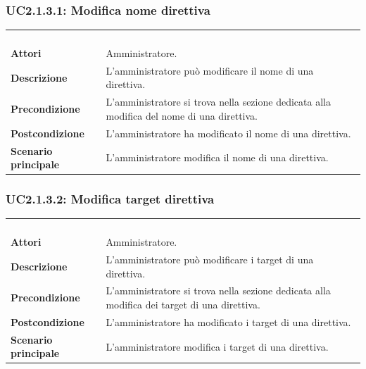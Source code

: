\newpage
\subsubsection{UC2.1.3.1: Modifica nome direttiva}
\label{UC2.1.3.1}
\begin{longtable}{l|p{10cm}}
\rowcolor[gray]{0.8} \multicolumn{2}{c}{} \\
\rowcolor[gray]{0.8} \multicolumn{2}{c}{\textbf{UC2.1.3.1 - Modifica nome direttiva}} \\
\rowcolor[gray]{0.8} \multicolumn{2}{c}{} \\
\hline
&\\
\textbf{Attori} & Amministratore.\\[7pt]
\textbf{Descrizione} & L'amministratore può modificare il nome di una direttiva.\\[7pt]
\textbf{Precondizione} & L'amministratore si trova nella sezione dedicata alla modifica del nome di una direttiva.\\[7pt]
\textbf{Postcondizione} & L'amministratore ha modificato il nome di una direttiva.\\[7pt]
\textbf{Scenario principale} &L'amministratore modifica il nome di una direttiva.\\[7pt]\hline
\end{longtable}

\subsubsection{UC2.1.3.2: Modifica target direttiva}
\label{UC2.1.3.2}
\begin{longtable}{l|p{10cm}}
\rowcolor[gray]{0.8} \multicolumn{2}{c}{} \\
\rowcolor[gray]{0.8} \multicolumn{2}{c}{\textbf{UC2.1.3.2 - Modifica target direttiva}} \\
\rowcolor[gray]{0.8} \multicolumn{2}{c}{} \\
\hline
&\\
\textbf{Attori} & Amministratore.\\[7pt]
\textbf{Descrizione} & L'amministratore può modificare i target di una direttiva.\\[7pt]
\textbf{Precondizione} & L'amministratore si trova nella sezione dedicata alla modifica dei target di una direttiva.\\[7pt]
\textbf{Postcondizione} & L'amministratore ha modificato i target di una direttiva.\\[7pt]
\textbf{Scenario principale} &L'amministratore modifica i target di una direttiva.\\[7pt]\hline
\end{longtable}

